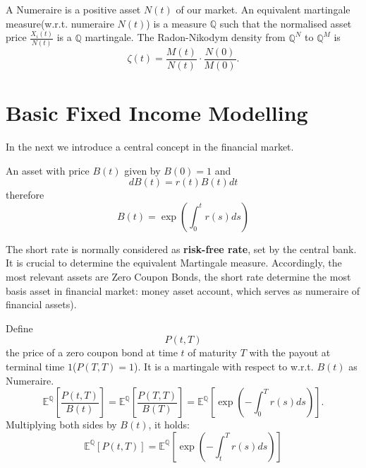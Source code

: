 \begin{definition}[Numeraire]
	A Numeraire is a positive asset $N(t)$ of our market. An equivalent martingale measure(w.r.t. numeraire $N(t)$) is a measure $\mathbb{Q}$ such that the normalised asset price $\frac{X_i(t)}{N(t)}$ is a $\mathbb{Q}$ martingale.
	The Radon-Nikodym density from $\mathbb{Q}^N$ to $\mathbb{Q}^M$ is
\[
\zeta(t) = \frac{M(t)}{N(t)} \cdot \frac{N(0)}{M(0)}.
\]
	
\end{definition}

\begin{theorem}
	
\end{theorem}



\section{Basic Fixed Income Modelling}
In the next we introduce a central concept in the financial market. 
\begin{definition}
	An asset with price $B(t)$ given by $B(0) = 1$ and 
	\begin{equation*}
		dB(t) = r(t)B(t)dt
	\end{equation*}
	therefore
	\begin{equation*}
		B(t) = \exp\left(\int_0^t r(s) ds\right)
	\end{equation*}
\end{definition}

The short rate is normally considered as \textbf{risk-free rate}, set by the central bank. It is crucial to determine the equivalent Martingale measure. Accordingly, the most relevant assets are Zero Coupon Bonds, the short rate determine the most basis asset in financial market: money asset account, which serves as numeraire of financial assets).


\begin{definition}
Define 
\begin{equation}
	P(t, T) 
\end{equation}
the price of a zero coupon bond at time $t$ of maturity $T$ with the payout at terminal time $1$($P(T, T) = 1$). It is a martingale with respect to w.r.t. $B(t)$ as Numeraire. 
	\begin{equation*}
		\mathbb{E}^{\mathbb{Q}}[ \frac{P(t, T)}{B(t)}] = \mathbb{E}^\mathbb{Q}\left[\frac{P(T, T)}{B(T)}\right] = \mathbb{E}^\mathbb{Q} \left[\exp(-\int_0^T r(s)ds)\right].
	\end{equation*} 
	Multiplying both sides by $B(t)$, it holds:
	\begin{equation*}
		\mathbb{E}^\mathbb{Q} [P(t, T)] = \mathbb{E}^\mathbb{Q}\left[\exp(-\int_t^T r(s) ds)\right]
	\end{equation*}
\end{definition}
 

